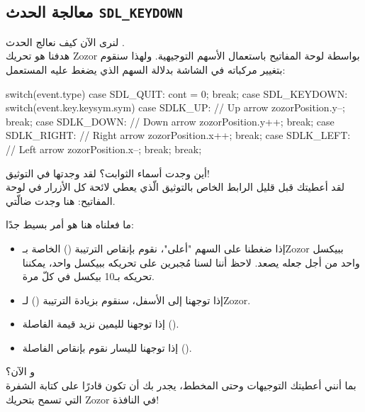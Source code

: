 \subsection{معالجة الحدث \texttt{SDL\_KEYDOWN}}

لنرى الآن كيف نعالج الحدث 
.\\
هدفنا هو تحريك 
\textenglish{Zozor}
بواسطة لوحة المفاتيح باستعمال الأسهم التوجيهية. ولهذا سنقوم بتغيير مركباته في الشاشة بدلالة السهم الذي يضغط عليه المستعمل:

\begin{Csource}
switch(event.type)
{
	case SDL_QUIT:
	cont = 0;
	break;
	case SDL_KEYDOWN:
	switch(event.key.keysym.sym)
	{
		case SDLK_UP: // Up arrow
		zozorPosition.y--;
		break;
		case SDLK_DOWN: // Down arrow
		zozorPosition.y++;
		break;
		case SDLK_RIGHT: // Right arrow
		zozorPosition.x++;
		break;
		case SDLK_LEFT: // Left arrow
		zozorPosition.x--;
		break;
	}
	break;
}
\end{Csource}

أين وجدت أسماء الثوابت؟  لقد وجدتها في التوثيق!\\
لقد أعطيتك قبل قليل الرابط الخاص بالتوثيق الّذي يعطي لائحة كل الأزرار في لوحة المفاتيح: هنا وجدت ضالّتي. 

ما فعلناه هنا هو أمر بسيط جدًا:

\begin{itemize}
	\item إذا ضغطنا على السهم "أعلى"، نقوم بإنقاص الترتيبة 
	()
	الخاصة بـ\textenglish{Zozor}
	ببيكسل واحد من أجل جعله يصعد. لاحظ أننا لسنا مُجبرين على تحريكه ببيكسل واحد، يمكننا تحريكه بـ10 بيكسل في كلّ مرة.
	\item إذا توجهنا إلى الأسفل، سنقوم بزيادة الترتيبة
	()
	لـ\textenglish{Zozor}.
	\item إذا توجهنا لليمين نزيد قيمة الفاصلة 
	().
	\item إذا توجهنا لليسار نقوم بإنقاص الفاصلة  
	().
\end{itemize}

و الآن؟\\
بما أنني أعطيتك التوجيهات وحتى المخطط، يجدر بك أن تكون قادرًا على كتابة الشفرة التي تسمح بتحريك
\textenglish{Zozor}
في النافذة!


